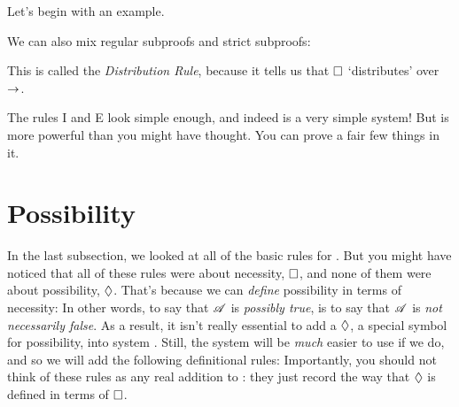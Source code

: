 Let's begin with an example.
\begin{fitchproof}
		\PR
		\PR
		\open
		\AS
		\close
\end{fitchproof}
We can also mix regular subproofs and strict subproofs:
\begin{fitchproof}
		\PR
		\open
		\AS
		\open
		\AS
		\close
		\close
		 
\end{fitchproof}
This is called the \emph{Distribution Rule}, because it tells us that $\Box$ `distributes' over $\rightarrow$.

The rules \ebox I and \ebox E look simple enough, and indeed \mlK{} is a very simple system! But \mlK{} is more powerful than you might have thought. You can prove a fair few things in it.

\section{Possibility}
\label{possibility}

In the last subsection, we looked at all of the basic rules for \mlK. But you might have noticed that all of these rules were about necessity, $\Box$, and none of them were about possibility, $\Diamond$. That's because we can \emph{define} possibility in terms of necessity:
In other words, to say that $\mathscr{A}$ is \emph{possibly true}, is to say that $\mathscr{A}$ is \emph{not necessarily false}. As a result, it isn't really essential to add a $\Diamond$, a special symbol for possibility, into system \mlK. Still, the system will be \emph{much} easier to use if we do, and so we will add the following definitional rules:
Importantly, you should not think of these rules as any real addition to \mlK: they just record the way that $\Diamond$ is defined in terms of $\Box$.

